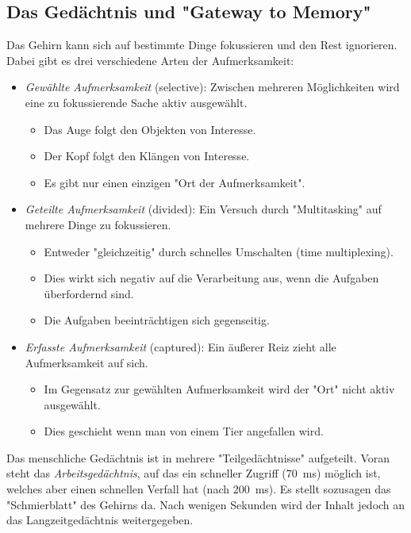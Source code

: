 		\subsection{Das Gedächtnis und "Gateway to Memory"}
			Das Gehirn kann sich auf bestimmte Dinge fokussieren und den Rest ignorieren. Dabei gibt es drei verschiedene Arten der Aufmerksamkeit:
			\begin{itemize}
				\item \emph{Gewählte Aufmerksamkeit} (selective): Zwischen mehreren Möglichkeiten wird eine zu fokussierende Sache aktiv ausgewählt.
					\begin{itemize}
						\item Das Auge folgt den Objekten von Interesse.
						\item Der Kopf folgt den Klängen von Interesse.
						\item Es gibt nur einen einzigen "Ort der Aufmerksamkeit".
					\end{itemize}
				\item \emph{Geteilte Aufmerksamkeit} (divided): Ein Versuch durch "Multitasking" auf mehrere Dinge zu fokussieren.
					\begin{itemize}
						\item Entweder "gleichzeitig" durch schnelles Umschalten (time multiplexing).
						\item Dies wirkt sich negativ auf die Verarbeitung aus, wenn die Aufgaben überfordernd sind.
						\item Die Aufgaben beeinträchtigen sich gegenseitig.
					\end{itemize}
				\item \emph{Erfasste Aufmerksamkeit} (captured): Ein äußerer Reiz zieht alle Aufmerksamkeit auf sich.
					\begin{itemize}
						\item Im Gegensatz zur gewählten Aufmerksamkeit wird der "Ort" nicht aktiv ausgewählt.
						\item Dies geschieht \zB wenn man von einem Tier angefallen wird.
					\end{itemize}
			\end{itemize}
		
			Das menschliche Gedächtnis ist in mehrere "Teilgedächtnisse" aufgeteilt. Voran steht das \emph{Arbeitsgedächtnis}, auf das ein schneller Zugriff (\ca \SI{70}{\milli\second}) möglich ist, welches aber einen schnellen Verfall hat (nach \ca \SI{200}{\milli\second}). Es stellt sozusagen das "Schmierblatt" des Gehirns da. Nach wenigen Sekunden wird der Inhalt jedoch an das Langzeitgedächtnis weitergegeben.
			
